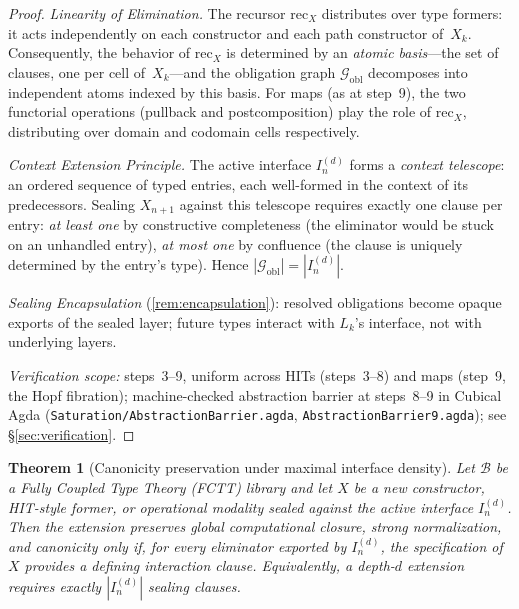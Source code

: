\documentclass[11pt,a4paper]{article}
\theoremstyle{plain}
\newtheorem{theorem}{Theorem}[section]
\theoremstyle{definition}
\theoremstyle{remark}
\begin{document}
\begin{proof}
\emph{Linearity of Elimination.}
The recursor $\mathrm{rec}_X$ distributes over type formers: it acts independently on each constructor and each path constructor of~$X_k$.
Consequently, the behavior of $\mathrm{rec}_X$ is determined by an \emph{atomic basis}---the set of clauses, one per cell of~$X_k$---and the obligation graph $\mathcal{G}_{\mathrm{obl}}$ decomposes into independent atoms indexed by this basis.
For maps (as at step~9), the two functorial operations (pullback and postcomposition) play the role of $\mathrm{rec}_X$, distributing over domain and codomain cells respectively.

\emph{Context Extension Principle.}
The active interface $I^{(d)}_n$ forms a \emph{context telescope}: an ordered sequence of typed entries, each well-formed in the context of its predecessors.
Sealing $X_{n+1}$ against this telescope requires exactly one clause per entry:
\emph{at least one} by constructive completeness (the eliminator would be stuck on an unhandled entry),
\emph{at most one} by confluence (the clause is uniquely determined by the entry's type).
Hence $|\mathcal{G}_{\mathrm{obl}}| = |I^{(d)}_n|$.

\emph{Sealing Encapsulation} (\cref{rem:encapsulation}): resolved obligations become opaque exports of the sealed layer; future types interact with $L_k$'s interface, not with underlying layers.

\emph{Verification scope:} steps~3--9, uniform across HITs (steps~3--8) and maps (step~9, the Hopf fibration);
machine-checked abstraction barrier at steps~8--9 in Cubical Agda (\texttt{Saturation/\allowbreak AbstractionBarrier.agda}, \texttt{AbstractionBarrier9.agda}); see \S\ref{sec:verification}.
\end{proof}

\begin{theorem}[Canonicity preservation under maximal interface density]
\label{thm:canonicity-preservation}
Let $\mathcal{B}$ be a Fully Coupled Type Theory (FCTT) library and let $X$ be a new constructor, HIT-style former, or operational modality sealed against the active interface $I_n^{(d)}$.
Then the extension preserves global computational closure, strong normalization, and canonicity only if, for every eliminator exported by $I_n^{(d)}$, the specification of $X$ provides a defining interaction clause.
Equivalently, a depth-$d$ extension requires exactly $|I_n^{(d)}|$ sealing clauses.
\end{theorem}
\end{document}
